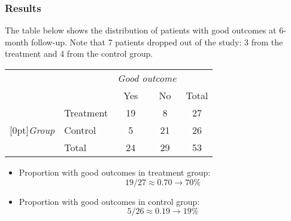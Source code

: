 
\begin{frame}
\frametitle{Results}

The table below shows the distribution of patients with good outcomes at 6-month follow-up. Note that 7 patients dropped out of the study: 3 from the treatment and 4 from the control group.

\begin{center}
\begin{tabular}{ll  cc c} 
			&				& \multicolumn{2}{c}{\textit{Good outcome}} \\
\cline{3-4}
			&							& Yes 	& No 	& Total	\\
\cline{2-5}
							&Treatment 	& 19	 	& 8		& 27 	\\
\raisebox{1.5ex}[0pt]{\textit{Group}}	&Control		& 5	 	& 21	 	& 26 \\
\cline{2-5}
							&Total		& 24		& 29		& 53
\end{tabular}
\end{center}

\pause

\begin{itemize}

\item Proportion with good outcomes in treatment group:
\[ 19 / 27 \approx 0.70 \rightarrow 70\% \]

\pause

\item Proportion with good outcomes in control group:
\[ 5 / 26 \approx 0.19 \rightarrow 19\% \]

\end{itemize}

\end{frame}


